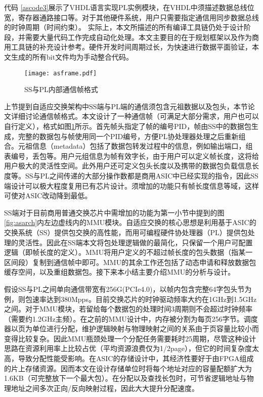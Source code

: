 代码 \ref{ascode3}展示了VHDL语言实现PL实例模块，在VHDL中须描述数据总线位宽，寄存器通路接口等。对于其他硬件系统，用户只需要指定通信用同步数据总线的时钟周期（时间约束）。
实际上，本文所描述的所有编译工具链仍处于设计阶段，并需要大量代码工作完成自动化处理。本文主要目的在于规划框架以及作为商用工具链的补充设计参考。硬件开发时间周期过长，为快速进行数据平面验证，本文生成的所有bit文件均为手动整合代码。



\begin{figure}[!ht]
	\centering 
	\texttt{[image: asframe.pdf]}
	\caption{SS与PL内部通信帧格式} \label{fig:asframe}
\end{figure}

上节提到自适应交换架构中SS端与PL端的通信须包含元祖数据以及包头，本节论文详细讨论通信帧格式。本文设计了一种通信帧（可满足大部分需求，用户也可以自行定义），格式如图\ref{fig:asframe}所示。首先帧头指定了帧的编号PID，帧由SS中的数据包生成，完整的数据包与帧使用同一个PID编号，方便PL协处理器处理之后重新组合。元祖信息（metadata）包括了数据包转发过程中的信息，例如输出端口，组表编号，丢包等。用户元组信息为帧有效字长，由于用户可以定义帧长度，这将给用户极大的灵活性空间。此外用户还可定义包头长度以及携带的数据包负载信息长度等。SS与PL之间传递的大部分操作数都是商用ASIC中已经实现的指令，因此SS端设计可以极大程度复用已有芯片设计。须增加的功能只有帧长度信息等域，这样可使对ASIC改动降到最低。


SS端对于目前商用普通交换芯片中需增加的功能为第一小节中提到的图 \ref{fig:asarch}内左边虚线内的MMU模块。自适应交换的核心思想是利用基于ASIC的交换系统（SS）提供包交换的高性能，而用可编程硬件协处理器（PL）提供包处理的灵活性。因此在SS端本文将包处理逻辑做的最简化，只保留一个用户可配置逻辑（即帧长度的定义）。MMU将用户定义的不超过帧长度的包头数据（指某一区间段）复制到通信帧中即可。MMU的其余工作还包括了动态申请和释放数据包缓存空间，以及重组数据包。接下来本小结主要介绍MMU的分析与设计。

假设SS与PL之间单向通信带宽有256G(PCIe4.0)，以帧内包含完整64字包头节为例，则包速率达到380Mpps。目前交换芯片的时钟驱动频率大约在1GHz到1.5GHz之间。对于MMU模块，若留给每个数据包的处理时间3周期则不会超过时钟频率（需要约1.2GHz主频）。在之前的MMU设计中，内存被分割为每页256字节。调度器以页为单位进行分配，维护逻辑映射与物理映射之间的关系由于页容量比较小而变得比较复杂。因此MMU瓶颈处理一个分配任务需要耗时25周期，尽管这种设计思路在资源利用率上比较占优（平均资源浪费仅为1/2page），但它的时间复杂度太高，导致分配性能受影响。在ASIC的存储设计中，其经济性要好于由FPGA组成的片上存储资源。因而本文在设计存储单位时将每个地址对应的容量配额扩大为1.6KB（可完整放下一个最大包）。在分配以及查找长包时，可节省逻辑地址与物理地址之间多次正向/反向映射过程，因此大大提升分配速度。

